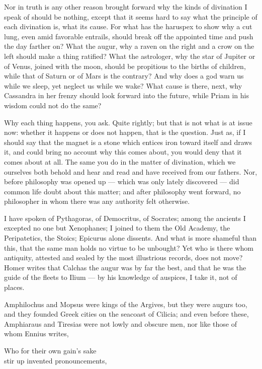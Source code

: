  Nor in truth is any other reason brought forward why the kinds of divination I speak of should be nothing, except that it seems hard to say what the principle of each divination is, what its cause. For what has the haruspex to show why a cut lung, even amid favorable entrails, should break off the appointed time and push the day farther on? What the augur, why a raven on the right and a crow on the left should make a thing ratified? What the astrologer, why the star of Jupiter or of Venus, joined with the moon, should be propitious to the births of children, while that of Saturn or of Mars is the contrary? And why does a god warn us while we sleep, yet neglect us while we wake? What cause is there, next, why Cassandra in her frenzy should look forward into the future, while Priam in his wisdom could not do the same?

 Why each thing happens, you ask. Quite rightly; but that is not what is at issue now: whether it happens or does not happen, that is the question. Just as, if I should say that the magnet is a stone which entices iron toward itself and draws it, and could bring no account why this comes about, you would deny that it comes about at all. The same you do in the matter of divination, which we ourselves both behold and hear and read and have received from our fathers. Nor, before philosophy was opened up — which was only lately discovered — did common life doubt about this matter; and after philosophy went forward, no philosopher in whom there was any authority felt otherwise.

 I have spoken of Pythagoras, of Democritus, of Socrates; among the ancients I excepted no one but Xenophanes; I joined to them the Old Academy, the Peripatetics, the Stoics; Epicurus alone dissents. And what is more shameful than this, that the same man holds no virtue to be unbought? Yet who is there whom antiquity, attested and sealed by the most illustrious records, does not move? Homer writes that Calchas the augur was by far the best, and that he was the guide of the fleets to Ilium — by his knowledge of auspices, I take it, not of places.

 Amphilochus and Mopsus were kings of the Argives, but they were augurs too, and they founded Greek cities on the seacoast of Cilicia; and even before these, Amphiaraus and Tiresias were not lowly and obscure men, nor like those of whom Ennius writes,

Who for their own gain's sake \\
stir up invented pronouncements,

